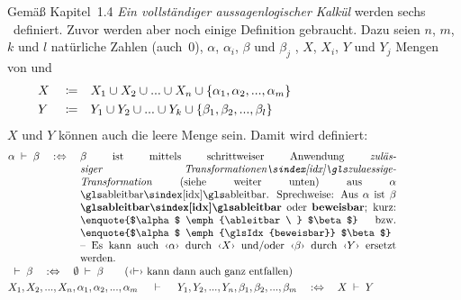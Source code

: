 Gemäß \cite{bib:Rautenberg} Kapitel~1.4 \emph{Ein vollständiger aussagenlogischer Kalkül} werden sechs \Basisregeln\ definiert. Zuvor werden aber noch einige Definition gebraucht. Dazu seien $n$, $m$, $k$ und $l$ natürliche Zahlen (auch~0), $\alpha$, $\alpha_i$, $\beta$ und $\beta_j$ , $X$, $X_i$, $Y$ und $Y_j$ Mengen von  und
\begin{align}
	&X&&\coloneqq&&X_1\cup X_2\cup...\cup X_n\cup\{\alpha_1,\alpha_2,...,\alpha_m\}
	\\
	&Y&&\coloneqq&&Y_1\cup Y_2\cup...\cup Y_k\cup\{\beta_1, \beta_2, ...,\beta_l \}
	&&&&&&&&&&&&&&&&&&&&
\end{align}
%
$X$ und $Y$ können auch die leere Menge sein. Damit wird definiert:
\begin{align}
	& \alpha \derive \beta \quad \metadefeq \quad
	\parbox[t]{10.5cm}{%
	$\beta$ ist mittels schrittweiser Anwendung \emph{\glsIdxBg{zulaessige-Transformation}{zulässiger Transformationen}} (siehe weiter unten) aus $\alpha$ \ableitbar.
	Sprechweise: Aus $\alpha$ ist $\beta$ \defn{\ableitbar} oder \defn{beweisbar};
	kurz: \enquote{$\alpha$ \emph{\ableitbar\ } $\beta$} \textbzw\ \enquote{$\alpha$ \emph{\glsIdx{beweisbar}} $\beta$}
	-- Es kann auch \chrqt{$\alpha$} durch \chrqt{$X$} und/oder \chrqt{$\beta$} durch \chrqt{$Y$} ersetzt werden.
	}
	\label{def:ableitbar}
	\\
	& \derive \beta \quad \metadefeq \quad \emptyset \derive \beta \qquad \text{(\chrqt{$\derivesym$} kann dann auch ganz entfallen)}
	\\
	&             X_1, X_2, ...,X_n, \alpha_1, \alpha_2, ..., \alpha_m \quad
	\derive \quad Y_1, Y_2, ...,Y_n,  \beta_1,  \beta_2,  ..., \beta_m \quad
	\metadefeq \quad X \derive Y
	\label{def:ableitbarKurz}
	\formulatoleft
\end{align}
%
